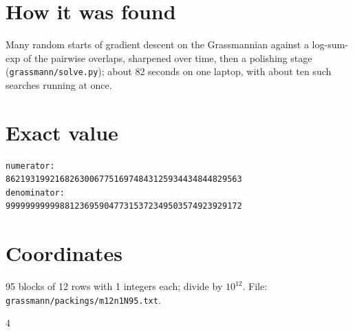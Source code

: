 \documentclass[11pt,a4paper]{article}
\begin{document}
\section{How it was found}
Many random starts of gradient descent on the Grassmannian against a log-sum-exp of the pairwise overlaps, sharpened over time, then a polishing stage (\texttt{grassmann/solve.py}); about 82 seconds on one laptop, with about ten such searches running at once.


\appendix
\section{Exact value}
{\small
\begin{verbatim}
numerator:
862193199216826300677516974843125934434844829563
denominator:
999999999998812369590477315372349503574923929172
\end{verbatim}}

\section{Coordinates}
95 blocks of 12 rows with 1 integers each; divide by $10^{12}$. File: \texttt{grassmann/packings/m12n1N95.txt}.
{\tiny
\begin{multicols}{4}
\end{multicols}}
\end{document}
